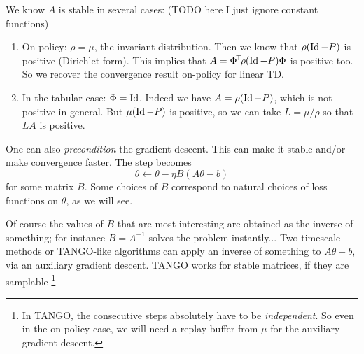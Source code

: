 \documentclass[11pt,a4paper]{article}
\begin{document}
We know $A$ is stable in several cases: (TODO here I just ignore constant
functions)
\begin{enumerate}
\item On-policy: $\rho=\mu$, the invariant distribution. Then we know that $\rho(\operatorname{Id}-P)$ is positive
(Dirichlet form). This implies that $A=\Phi^{\!\top}\!\rho (\operatorname{Id}-P)\Phi$ is
positive too. So we recover the convergence result on-policy for linear
TD.
\item In the tabular case: $\Phi=\operatorname{Id}$. Indeed we have $A=\rho (\operatorname{Id}-P)$,
which is not positive in general. But $\mu (\operatorname{Id}-P)$ is positive, so we can take
$L=\mu/\rho$ so that $LA$ is positive.
\end{enumerate}

One can also \emph{precondition} the gradient descent. This can make it
stable and/or make convergence faster. The step becomes
\begin{equation}
\theta\gets \theta-\eta B(A\theta-b)
\end{equation}
for some matrix $B$. Some choices of $B$ correspond to natural choices of
loss functions on $\theta$, as we will see.

Of course the values of $B$ that are most interesting are obtained as the
inverse of something; for instance $B=A^{-1}$ solves the problem
instantly... Two-timescale methods or TANGO-like algorithms can apply an
inverse of something to $A\theta-b$, via an auxiliary gradient descent.
TANGO works for stable matrices, if they are samplable \footnote{In
TANGO, the consecutive steps absolutely have to be \emph{independent}. So even in
the on-policy case, we will need a replay buffer from $\mu$ for the auxiliary
gradient descent.}
\end{document}
